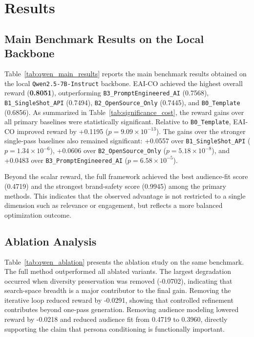 %
% 
% 

\section{Results}

\subsection{Main Benchmark Results on the Local Backbone}

Table~\ref{tab:qwen_main_results} reports the main benchmark results obtained on the local \texttt{Qwen2.5-7B-Instruct} backbone. EAI-CO achieved the highest overall reward (\textbf{0.8051}), outperforming \texttt{B3\_PromptEngineered\_AI} (0.7568), \texttt{B1\_SingleShot\_API} (0.7494), \texttt{B2\_OpenSource\_Only} (0.7445), and \texttt{B0\_Template} (0.6856). As summarized in Table~\ref{tab:significance_cost}, the reward gains over all primary baselines were statistically significant. Relative to \texttt{B0\_Template}, EAI-CO improved reward by +0.1195 ($p=9.09\times10^{-13}$). The gains over the stronger single-pass baselines also remained significant: +0.0557 over \texttt{B1\_SingleShot\_API} ($p=1.34\times10^{-6}$), +0.0606 over \texttt{B2\_OpenSource\_Only} ($p=5.18\times10^{-8}$), and +0.0483 over \texttt{B3\_PromptEngineered\_AI} ($p=6.58\times10^{-5}$).

Beyond the scalar reward, the full framework achieved the best audience-fit score (0.4719) and the strongest brand-safety score (0.9945) among the primary methods. This indicates that the observed advantage is not restricted to a single dimension such as relevance or engagement, but reflects a more balanced optimization outcome.

\subsection{Ablation Analysis}

Table~\ref{tab:qwen_ablation} presents the ablation study on the same benchmark. The full method outperformed all ablated variants. The largest degradation occurred when diversity preservation was removed (-0.0702), indicating that search-space breadth is a major contributor to the final gain. Removing the iterative loop reduced reward by -0.0291, showing that controlled refinement contributes beyond one-pass generation. Removing audience modeling lowered reward by -0.0218 and reduced audience fit from 0.4719 to 0.3960, directly supporting the claim that persona conditioning is functionally important.

